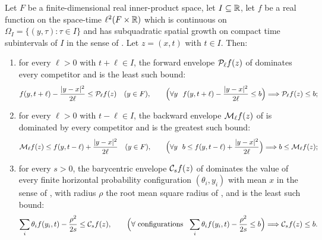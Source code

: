 \begin{lemma}
Let $F$ be a finite-dimensional real inner-product space, let $I\subseteq\mathbb{R}$,
let $f$ be a real function on the space-time $\ell^2(F\times\mathbb{R})$ which is
continuous on $\Omega_I=\{(y,\tau):\tau\in I\}$ and has subquadratic spatial
growth on compact time subintervals of $I$ in the sense of
. Let $z=(x,t)$ with $t\in I$. Then:
\begin{enumerate}
\item for every $\ell>0$ with $t+\ell\in I$, the forward envelope
$\mathcal{P}_\ell f(z)$ of  dominates every competitor and is the
least such bound:
\[
  f(y,t+\ell)-\frac{|y-x|^2}{2\ell}\le\mathcal{P}_\ell f(z)\quad(y\in F),
  \qquad
  \Bigl(\forall y\ \ f(y,t+\ell)-\frac{|y-x|^2}{2\ell}\le b\Bigr)
     \Longrightarrow \mathcal{P}_\ell f(z)\le b;
\]
\item for every $\ell>0$ with $t-\ell\in I$, the backward envelope
$\mathcal{M}_\ell f(z)$ of  is dominated by every competitor and is
the greatest such bound:
\[
  \mathcal{M}_\ell f(z)\le f(y,t-\ell)+\frac{|y-x|^2}{2\ell}\quad(y\in F),
  \qquad
  \Bigl(\forall y\ \ b\le f(y,t-\ell)+\frac{|y-x|^2}{2\ell}\Bigr)
     \Longrightarrow b\le\mathcal{M}_\ell f(z);
\]
\item for every $s>0$, the barycentric envelope $\mathcal{C}_sf(z)$ of
 dominates the value of every finite horizontal probability
configuration $(\theta_i,y_i)$ with mean $x$ in the sense of
, with radius $\rho$ the root mean square radius of
, and is the least such bound:
\[
  \sum_i\theta_if(y_i,t)-\frac{\rho^2}{2s}\le\mathcal{C}_sf(z),
  \qquad
  \Bigl(\forall\ \text{configurations}\ \
     \sum_i\theta_if(y_i,t)-\frac{\rho^2}{2s}\le b\Bigr)
     \Longrightarrow \mathcal{C}_sf(z)\le b .
\]
\end{enumerate}
\end{lemma}
